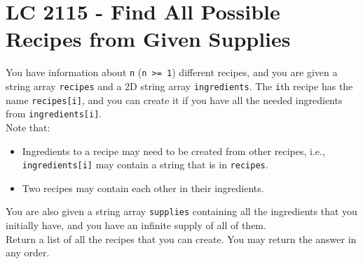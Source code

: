 \section{LC 2115 - Find All Possible Recipes from Given Supplies}\label{lc2115}
You have information about {\colorbox{CodeBackground}{\lstinline|n|}} ({\colorbox{CodeBackground}{\lstinline|n >= 1|}}) different recipes, and you are given a string array {\colorbox{CodeBackground}{\lstinline|recipes|}} and a 2D string array {\colorbox{CodeBackground}{\lstinline|ingredients|}}. The {\colorbox{CodeBackground}{\lstinline|i|}}th recipe has the name {\colorbox{CodeBackground}{\lstinline|recipes[i]|}}, and you can create it if you have all the needed ingredients from {\colorbox{CodeBackground}{\lstinline|ingredients[i]|}}. \\

Note that:
\begin{itemize}
\item Ingredients to a recipe may need to be created from other recipes, i.e., {\colorbox{CodeBackground}{\lstinline|ingredients[i]|}} may contain a string that is in {\colorbox{CodeBackground}{\lstinline|recipes|}}.
\item Two recipes may contain each other in their ingredients.
\end{itemize}

You are also given a string array {\colorbox{CodeBackground}{\lstinline|supplies|}} containing all the ingredients that you initially have, and you have an infinite supply of all of them.\\

Return a list of all the recipes that you can create. You may return the answer in any order.\\

